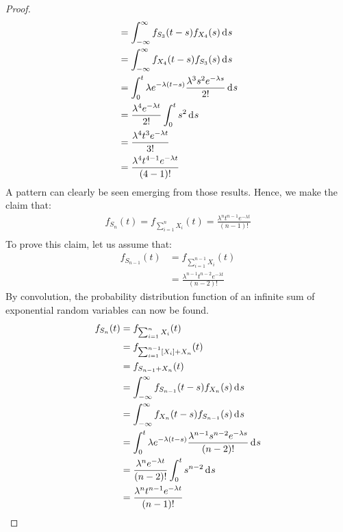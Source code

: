 \documentclass[12pt]{article}
\begin{document}
\begin{proof}
\begin{equation}
\begin{split}
									&=	\int^\infty_{-\infty} f_{S_3}(t-s)f_{X_4}(s)\mathop{}\!\mathrm{d^{}}s\\
									&=	\int^\infty_{-\infty} f_{X_4}(t-s)f_{S_3}(s)\mathop{}\!\mathrm{d^{}}s\\
									&=	\int^t_0 \lambda e^{-\lambda(t-s)}\frac{\lambda^3 s^2 e^{-\lambda s}}{2!}\mathop{}\!\mathrm{d^{}}s\\
									&=	\frac{\lambda^4 e^{-\lambda t}}{2!}\int^t_0 s^2\mathop{}\!\mathrm{d^{}}s\\
									&=	\frac{\lambda^4 t^3 e^{-\lambda t}}{3!}\\
									&=	\frac{\lambda^4 t^{4-1} e^{-\lambda t}}{(4-1)!}\\
		\end{split}
	\end{equation}
	A pattern can clearly be seen emerging from those results. Hence, we make the claim that:
	\begin{equation}
		\begin{split}
			f_{S_n}(t) = f_{\sum^n_{i=1}X_i}(t) = \frac{\lambda^n t^{n-1} e^{-\lambda t}}{(n-1)!}\\
		\end{split}
	\end{equation}
	To prove this claim, let us assume that:
	\begin{equation}
		\begin{split}
			f_{S_{n-1}}(t)	&=	f_{\sum^{n-1}_{i=1}X_i} (t)\\
							&=	\frac{\lambda^{n-1} t^{n-2} e^{-\lambda t}}{(n-2)!}
		\end{split}
	\end{equation}
	By convolution, the probability distribution function of an infinite sum of exponential random variables can now be
	found.
	\begin{equation}
		\begin{split}
			f_{S_n}(t)	&=	f_{\sum^n_{i=1}X_i}(t)\\
						&=	f_{\sum^{n-1}_{i=1}[X_i] + X_n }(t)\\
						&=	f_{S_{n-1} + X_n }(t)\\
						&=	\int^\infty_{-\infty} f_{S_{n-1}}(t-s)f_{X_n}(s)\diff{s}\\
						&=	\int^\infty_{-\infty} f_{X_n}(t-s)f_{S_{n-1}}(s)\diff{s}\\
						&=	\int^t_0 \lambda e^{-\lambda(t-s)}\frac{\lambda^{n-1} s^{n-2} e^{-\lambda s}}{(n-2)!}\diff{s}\\
						&=	\frac{\lambda^n e^{-\lambda t}}{(n-2)!} \int^t_0 s^{n-2}\diff{s}\\
						&=	\frac{\lambda^n t^{n-1} e^{-\lambda t}}{(n-1)!}\\

\end{split}
\end{equation}
\end{proof}
\end{document}
